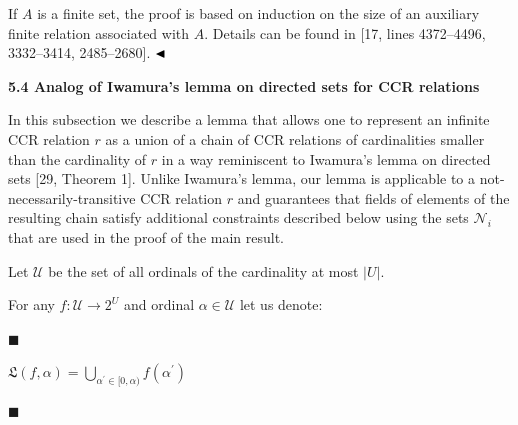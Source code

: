 \documentclass[10pt,a4paper]{amsart}
\begin{document}
 
 
If $A$ is a finite set, the proof is based on induction on the size of an auxiliary finite relation associated with $A$. Details can be found in [17, lines 4372–4496, 3332–3414, 2485–2680]. $\hfill\blacktriangleleft$\par
 
 
 
 
 
\par\medskip\noindent\textbf{5.4 Analog of Iwamura’s lemma on directed sets for CCR relations}\par
 
 
In this subsection we describe a lemma that allows one to represent an infinite CCR relation $r$ as a union of a chain of CCR relations of cardinalities smaller than the cardinality of $r$ in a way reminiscent to Iwamura’s lemma on directed sets [29, Theorem 1]. Unlike Iwamura’s lemma, our lemma is applicable to a not-necessarily-transitive CCR relation $r$ and guarantees that fields of elements of the resulting chain satisfy additional constraints described below using the sets $\mathcal{N}_{i}$ that are used in the proof of the main result.\par
 
 
 
Let $\mathcal{U}$ be the set of all ordinals of the cardinality at most $|U|$.\par
 
 
 
For any $f:\mathcal{U}\to 2^{U}$ and ordinal $\alpha\in\mathcal{U}$ let us denote:\par
  
\par\noindent  $\blacksquare$ 
 
$\mathfrak{L}(f,\alpha)=\bigcup_{\alpha^{\prime}\in[0,\alpha)}f(\alpha^{\prime})$\par
 
 
 
\par\noindent  $\blacksquare$ 
 
\end{document}
